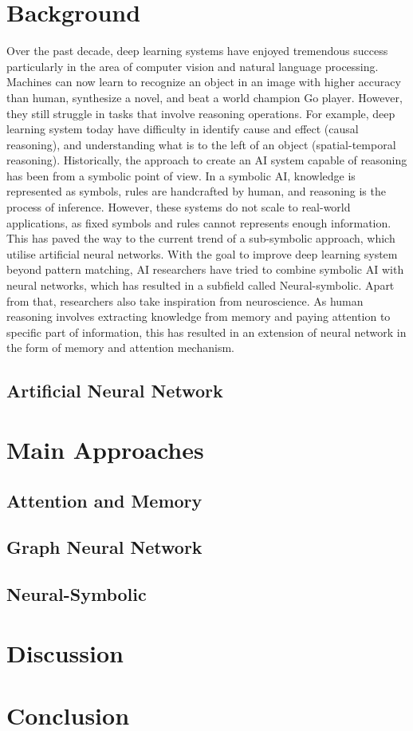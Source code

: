 \documentclass[journal]{IEEEtran}
\begin{document}
\section{Background}
Over the past decade, deep learning systems have enjoyed tremendous success particularly in the area of computer vision and natural language processing.
Machines can now learn to recognize an object in an image with higher accuracy than human, synthesize a novel, and beat a world champion Go player.
However, they still struggle in tasks that involve reasoning operations. For example, deep learning system today have difficulty in
identify cause and effect (causal reasoning), and understanding what is to the left of an object (spatial-temporal reasoning).
Historically, the approach to create an AI system capable of reasoning has been from a symbolic point of view.
In a symbolic AI, knowledge is represented as symbols, rules are handcrafted by human, and reasoning is the process of inference.
However, these systems do not scale to real-world applications, as fixed symbols and rules cannot represents enough information. 
This has paved the way to the current trend of a sub-symbolic approach, which utilise artificial neural networks. 
With the goal to improve deep learning system beyond pattern matching, AI researchers have tried to combine symbolic AI with neural networks,
which has resulted in a subfield called Neural-symbolic. Apart from that, researchers also take inspiration from neuroscience. 
As human reasoning involves extracting knowledge from memory and paying attention to specific part of information, 
this has resulted in an extension of neural network in the form of memory and attention mechanism. 

\subsection{Artificial Neural Network}

\section{Main Approaches}
\subsection{Attention and Memory}

\subsection{Graph Neural Network}

\subsection{Neural-Symbolic}

\section{Discussion}

\section{Conclusion}

% 
% 
\end{document}
